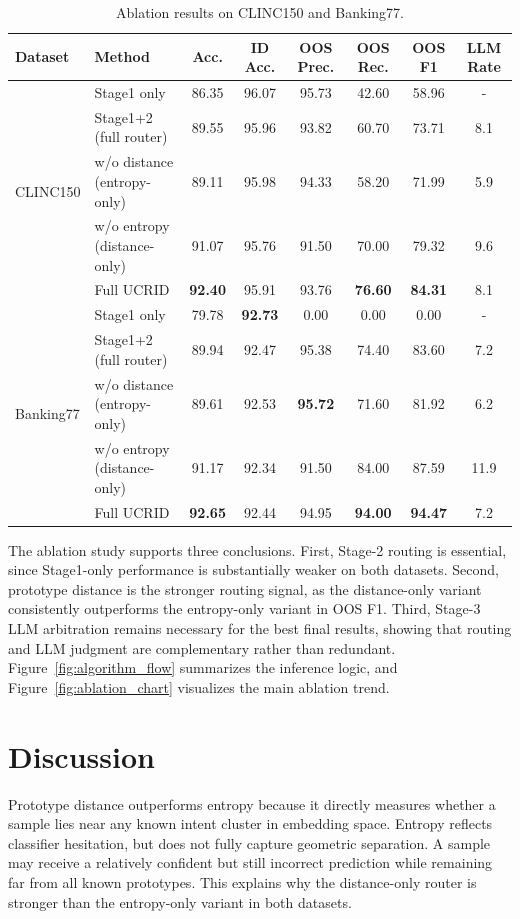 \documentclass[11pt]{article}
\begin{document}
\begin{table}[t]
\centering
\caption{Ablation results on CLINC150 and Banking77.}
\label{tab:ablation}
\begin{tabular}{llcccccc}
\toprule
Dataset & Method & Acc. & ID Acc. & OOS Prec. & OOS Rec. & OOS F1 & LLM Rate \\
\midrule
\multirow{5}{*}{CLINC150}
& Stage1 only & 86.35 & 96.07 & 95.73 & 42.60 & 58.96 & - \\
& Stage1+2 (full router) & 89.55 & 95.96 & 93.82 & 60.70 & 73.71 & 8.1 \\
& w/o distance (entropy-only) & 89.11 & 95.98 & 94.33 & 58.20 & 71.99 & 5.9 \\
& w/o entropy (distance-only) & 91.07 & 95.76 & 91.50 & 70.00 & 79.32 & 9.6 \\
& Full UCRID & \textbf{92.40} & 95.91 & 93.76 & \textbf{76.60} & \textbf{84.31} & 8.1 \\
\midrule
\multirow{5}{*}{Banking77}
& Stage1 only & 79.78 & \textbf{92.73} & 0.00 & 0.00 & 0.00 & - \\
& Stage1+2 (full router) & 89.94 & 92.47 & 95.38 & 74.40 & 83.60 & 7.2 \\
& w/o distance (entropy-only) & 89.61 & 92.53 & \textbf{95.72} & 71.60 & 81.92 & 6.2 \\
& w/o entropy (distance-only) & 91.17 & 92.34 & 91.50 & 84.00 & 87.59 & 11.9 \\
& Full UCRID & \textbf{92.65} & 92.44 & 94.95 & \textbf{94.00} & \textbf{94.47} & 7.2 \\
\bottomrule
\end{tabular}
\end{table}

The ablation study supports three conclusions. First, Stage-2 routing is essential, since Stage1-only performance is substantially weaker on both datasets. Second, prototype distance is the stronger routing signal, as the distance-only variant consistently outperforms the entropy-only variant in OOS F1. Third, Stage-3 LLM arbitration remains necessary for the best final results, showing that routing and LLM judgment are complementary rather than redundant. Figure~\ref{fig:algorithm_flow} summarizes the inference logic, and Figure~\ref{fig:ablation_chart} visualizes the main ablation trend.

\section{Discussion}
Prototype distance outperforms entropy because it directly measures whether a sample lies near any known intent cluster in embedding space. Entropy reflects classifier hesitation, but does not fully capture geometric separation. A sample may receive a relatively confident but still incorrect prediction while remaining far from all known prototypes. This explains why the distance-only router is stronger than the entropy-only variant in both datasets.
\end{document}
